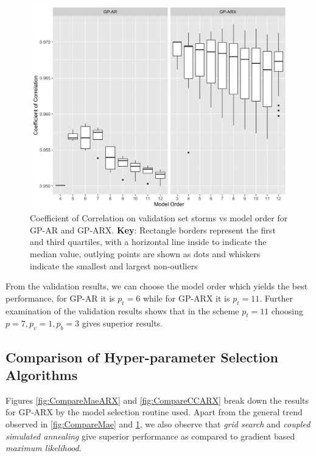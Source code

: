 \documentclass{article}
\begin{document}
\begin{figure}[h]
\includegraphics[width=\textwidth]{Compare-cc.png}
\caption{Coefficient of Correlation on validation set storms vs model order for GP-AR and GP-ARX. \textbf{Key}: Rectangle borders represent the first and third quartiles, with a horizontal line inside to indicate the median value, outlying points are shown as dots and whiskers indicate the smallest and largest non-outliers}
\label{fig:CompareCC}
\end{figure}

From the validation results, we can choose the model order which yields the best performance, for GP-AR it is $p_t = 6$ while for GP-ARX it is $p_t = 11$. Further examination of the validation results shows that in the scheme $p_t = 11$ choosing $p = 7, p_v = 1, p_b = 3$ gives superior results.


\subsection*{Comparison of Hyper-parameter Selection Algorithms}
Figures \ref{fig:CompareMaeARX} and \ref{fig:CompareCCARX} break down the results for GP-ARX by the model selection routine used. Apart from the general trend observed in \ref{fig:CompareMae} and \ref{fig:CompareCC}, we also observe that \emph{grid search} and \emph{coupled simulated annealing} give superior performance as compared to gradient based \emph{maximum likelihood}.
\end{document}
